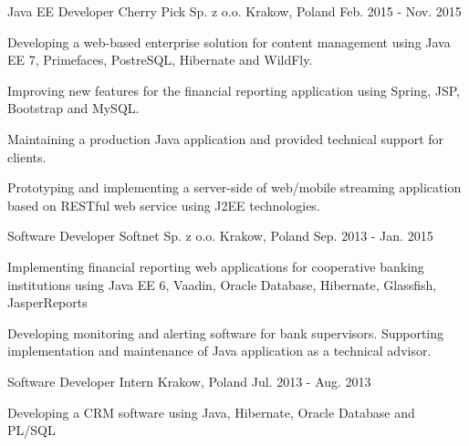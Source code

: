 \begin{cventries}
  \cventry
    {Java EE Developer} %
    {Cherry Pick Sp. z o.o.} %
    {Krakow, Poland} %
    {Feb. 2015 - Nov. 2015} %
    {
      \begin{cvitems} %
        \item {Developing a web-based enterprise solution for content management using
Java EE 7, Primefaces, PostreSQL, Hibernate and WildFly.}
		\item {Improving new features for the financial reporting application using Spring, JSP, Bootstrap and MySQL.}
		\item {Maintaining a production Java application and provided technical support for clients.}
        \item {Prototyping and implementing a server-side of web/mobile
streaming application based on RESTful web service using J2EE technologies.}
      \end{cvitems}
    }

  \cventry
    {Software Developer} %
    {Softnet Sp. z o.o.} %
    {Krakow, Poland} %
    {Sep. 2013 - Jan. 2015} %
    {
      \begin{cvitems} %
       \item {Implementing financial reporting web applications for cooperative banking institutions using Java EE 6, Vaadin, Oracle Database, Hibernate, Glassfish, JasperReports}
	  \item {Developing monitoring and alerting software for bank supervisors. Supporting implementation and maintenance of Java application as a technical advisor.} 
      \end{cvitems}
    }
  \cventry
    {Software Developer Intern} %
    {} %
    {Krakow, Poland} %
    {Jul. 2013 - Aug. 2013} %
    {
      \begin{cvitems} %
       \item {Developing a CRM software using Java, Hibernate, Oracle Database and PL/SQL}
      \end{cvitems}
    }
\end{cventries}
